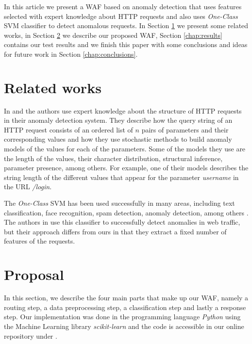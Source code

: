 In this article we present a WAF based on anomaly detection that uses features
selected with expert knowledge about HTTP requests and also uses
\textit{One-Class} SVM classifier to detect anomalous requests.
In Section \ref{chap:related_works} we present some related works, in Section
\ref{chap:proposal} we describe our proposed WAF, Section \ref{chap:results}
contains our test results and we finish this paper with some conclusions and
ideas for future work in Section \ref{chap:conclusions}.


\section{Related works}
\label{chap:related_works}

In \cite{kruegel2003anomaly} and \cite{kruegel2005multi} the authors use
expert knowledge about the structure of HTTP requests in their anomaly
detection system.
They describe how the query string of an HTTP request consists of an ordered
list of $n$ pairs of parameters and their corresponding values and how
they use stochastic methods to build anomaly models of the values for
each of the parameters. Some of the models they use are the length of the
values, their character distribution, structural inference, parameter
presence, among others.
For example, one of their models describes the string length of the different
values that appear for the parameter \textit{username} in the URL
\textit{/login}.

The \textit{One-Class} SVM has been used successfully in many areas,
including text classification, face recognition, spam detection, anomaly
detection, among others \cite{khan2009survey}.
The authors in \cite{parhizkar2015oc} use this classifier to successfully
detect anomalies in web traffic, but their approach differs from ours in
that they extract a fixed number of features of the requests.


\section{Proposal}
\label{chap:proposal}

In this section, we describe the four main parts that make up our WAF,
namely a routing step, a data preprocessing step, a classification step
and lastly a response step.
Our implementation was done in the programming language \textit{Python}
using the Machine Learning library \textit{scikit-learn} and the code
is accessible in our online repository under \TheRepoUrl.


